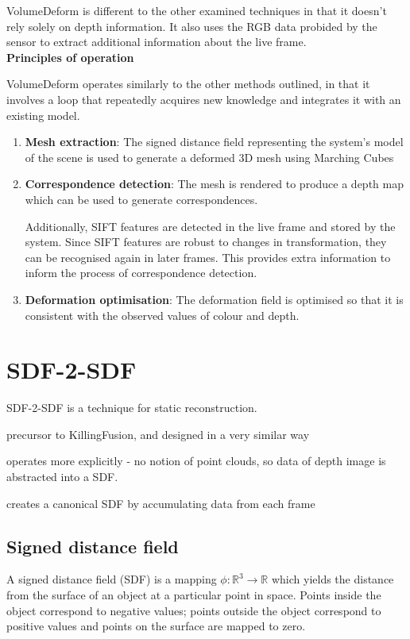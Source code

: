 \documentclass[12pt,twoside]{report}
\begin{document}
VolumeDeform is different to the other examined techniques in that it doesn't rely solely on depth information. It also uses the RGB data probided by the sensor to extract additional information about the live frame.\\


\noindent\textbf{Principles of operation}

VolumeDeform operates similarly to the other methods outlined, in that it involves a loop that repeatedly acquires new knowledge and integrates it with an existing model.

\begin{enumerate}
\item \textbf{Mesh extraction}: The signed distance field representing the system's model of the scene is used to generate a deformed 3D mesh using Marching Cubes
\item \textbf{Correspondence detection}: The mesh is rendered to produce a depth map which can be used to generate correspondences.

Additionally, SIFT features are detected in the live frame and stored by the system. Since SIFT features are robust to changes in transformation, they can be recognised again in later frames. This provides extra information to inform the process of correspondence detection.

\item \textbf{Deformation optimisation}: The deformation field is optimised so that it is consistent with the observed values of colour and depth.
\end{enumerate}


\section{SDF-2-SDF}

SDF-2-SDF is a technique for static reconstruction.

precursor to KillingFusion, and designed in a very similar way

operates more explicitly - no notion of point clouds, so data of depth image is abstracted into a SDF. 

creates a canonical SDF by accumulating data from each frame

\subsection{Signed distance field}

A signed distance field (SDF) is a mapping $\phi : \mathbb{R}^3 \rightarrow  \mathbb{R}$ which yields the distance from the surface of an object at a particular point in space. 
Points inside the object correspond to negative values; points outside the object correspond to positive values and points on the surface are mapped to zero.
\end{document}
